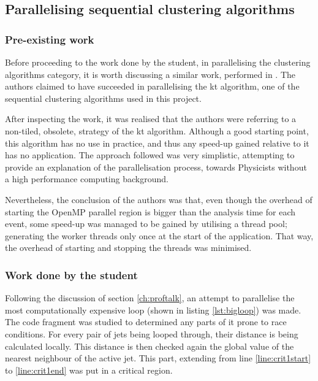 \subsection{Parallelising sequential clustering algorithms}

\subsubsection{Pre-existing work}\label{ch:otherswork}

Before proceeding to the work done by the student, in parallelising the clustering algorithms category, it is worth discussing a similar work, performed in \cite{forster2017parallel}. The authors claimed to have succeeded in parallelising the kt algorithm, one of the sequential clustering algorithms used in this project.

After inspecting the work, it was realised that the authors were referring to a non-tiled, obsolete, strategy of the kt algorithm. Although a good starting point, this algorithm has no use in practice, and thus any speed-up gained relative to it has no application. The approach followed was very simplistic, attempting to provide an explanation of the parallelisation process, towards Physicists without a high performance computing background.

Nevertheless, the conclusion of the authors was that, even though the overhead of starting the OpenMP parallel region is bigger than the analysis time for each event, some speed-up was managed to be gained by utilising a thread pool; generating the worker threads only once at the start of the application. That way, the overhead of starting and stopping the threads was minimised.

\subsubsection{Work done by the student}

Following the discussion of section \ref{ch:proftalk}, an attempt to parallelise the most computationally expensive loop (shown in listing \ref{lst:bigloop}) was made. The code fragment was studied to determined any parts of it prone to race conditions. For every pair of jets being looped through, their distance is being calculated locally. This distance is then checked again the global value of the nearest neighbour of the active jet. This part, extending from line \ref{line:crit1start} to \ref{line:crit1end} was put in a critical region.

